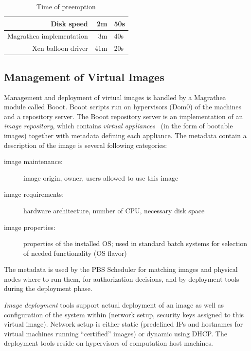 \documentclass[a4paper]{article}
\begin{document}
\begin{table}[h]
\begin{center} 
\begin{tabular}{|@{\ }r@{\quad}|@{\quad}r@{\ }l@{\ }|}
\hline
Disk speed & 2m & 50s\\
\hline
Magrathea implementation& 3m & 40s \\
\hline
Xen balloon driver & 41m & 20s \\
\hline
\end{tabular}
\label{tab:pre}
\caption{Time of preemption}
\end{center}
\end{table}

\subsection{Management of Virtual Images}

Management and deployment of virtual images is handled by a Magrathea
module called Booot. Booot scripts run on hypervisors (Dom0) of the
machines and a repository server.
The Booot repository server is an
implementation of an \textit{image repository}, which contains \textit{virtual appliances}~\cite{appliances}
(in the form of bootable images) together with metadata defining each appliance. The metadata contain
a description of the image is several following categories:
\begin{description}
\item[image maintenance:] image origin, owner, users allowed to use this image
\item[image requirements:] hardware architecture, number of CPU, necessary disk space
\item[image properties:]  properties of the installed OS; used in standard batch systems for selection
 of needed functionality (OS flavor)
\end{description}
The metadata is used by the PBS Scheduler for matching images and physical
nodes where to run them, for authorization decisions, and by deployment 
tools during the deployment phase.

\emph{Image deployment} tools support actual deployment of an image as well as configuration of the system within (network setup,
security keys assigned to this virtual image). Network setup is either static (predefined IPs and hostnames for virtual machines 
running ``certified'' images) or dynamic using DHCP.
The deployment tools reside
on hypervisors of computation host machines. 
\end{document}
